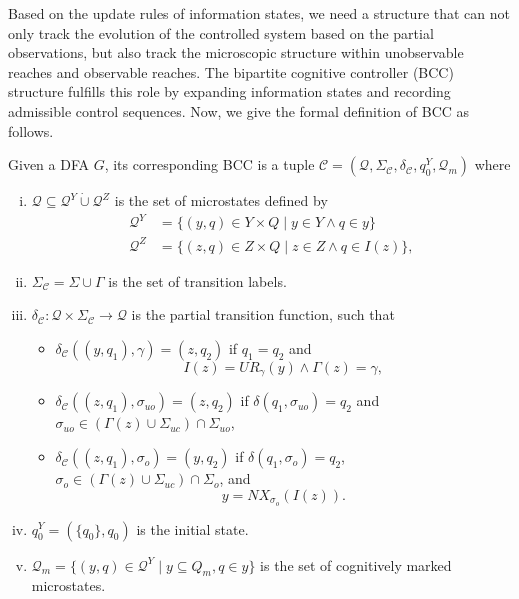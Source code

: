 \documentclass[journal,twoside,web]{ieeecolor}
\begin{document}
Based on the update rules of information states, we need a structure that can not only track the evolution of the controlled system based on the partial observations, but also track the microscopic structure within unobservable reaches and observable reaches.
%
The bipartite cognitive controller (BCC) structure fulfills this role by expanding information states and recording admissible control sequences.
Now, we give the formal definition of BCC as follows.
%
\begin{definition}\label{def:bcc}
Given a DFA $G$, its corresponding BCC is a tuple
$
\mathcal{C} = (\bm{\mathcal{Q}}, \Sigma_\mathcal{C}, \delta_\mathcal{C}, q^Y_0, \bm{\mathcal{Q}}_m)
$
where
\begin{enumerate}[(i)]
    \item $\bm{\mathcal{Q}} \subseteq \bm{\mathcal{Q}}^Y \dot{\cup} \bm{\mathcal{Q}}^Z$ is the set of microstates defined by
    $$
    \begin{aligned}
        \bm{\mathcal{Q}}^Y &= \{ (y, q) \in Y \times Q \mid y \in Y \wedge q \in y \} \\
        \bm{\mathcal{Q}}^Z &= \{ (z, q) \in Z \times Q \mid z \in Z \wedge q \in I(z) \},        
    \end{aligned}
    $$

    \item $\Sigma_\mathcal{C} = \Sigma \cup \Gamma$ is the set of transition labels.

    \item $\delta_\mathcal{C}: \bm{\mathcal{Q}} \times \Sigma_\mathcal{C} \rightarrow \bm{\mathcal{Q}}$ is the partial transition function, such that
    \begin{itemize}
        \item $\delta_\mathcal{C}((y,q_1),\gamma) = (z,q_2)$ if $q_1 = q_2$ and 
        $$
        I(z) = UR_{\gamma}(y) \wedge \Gamma(z) = \gamma,
        $$
        \item $\delta_\mathcal{C}((z,q_1), \sigma_{uo}) = (z,q_2)$ if $\delta(q_1,\sigma_{uo})=q_2$ and $\sigma_{uo} \in (\Gamma(z)\cup\Sigma_{uc}) \cap \Sigma_{uo}$,
        \item $\delta_\mathcal{C}((z,q_1),\sigma_o) = (y,q_2)$ if $\delta(q_1, \sigma_o)=q_2$, $\sigma_o \in (\Gamma(z) \cup \Sigma_{uc}) \cap \Sigma_o$, and
        $$
        y = NX_{\sigma_o}(I(z)).
        $$
    \end{itemize}

    \item $q^Y_0 = (\{q_0\}, q_0)$ is the initial state.

    \item $\bm{\mathcal{Q}}_m = \{ (y,q) \in \bm{\mathcal{Q}}^Y \mid y\subseteq Q_m, q\in y \}$ is the set of cognitively marked microstates.
\end{enumerate}
\end{definition}
\end{document}
